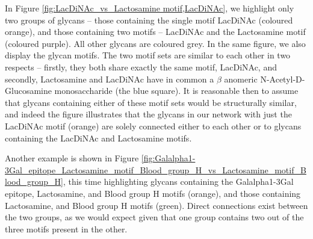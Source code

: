 \documentclass[12pt,a4paper]{article}
\begin{document}
In Figure \ref{fig:LacDiNAc_vs_Lactosamine motif,LacDiNAc}, we highlight only two groups of glycans -- those containing the single motif LacDiNAc (coloured orange), and those containing two motifs -- LacDiNAc and the Lactosamine motif (coloured purple). All other glycans are coloured grey. In the same figure, we also display the glycan motifs. The two motif sets are similar to each other in two respects -- firstly, they both share exactly the same motif, LacDiNAc, and secondly, Lactosamine and LacDiNAc have in common a $\beta$ anomeric N-Acetyl-D-Glucosamine monosaccharide (the blue square). It is reasonable then to assume that glycans containing either of these motif sets would be structurally similar, and indeed the figure illustrates that the glycans in our network with just the LacDiNAc motif  (orange) are solely connected either to each other or to glycans containing the LacDiNAc and Lactosamine motifs.

Another example is shown in Figure \ref{fig:Galalpha1-3Gal_epitope_Lactosamine_motif_Blood_group_H_vs_Lactosamine_motif_Blood_group_H}, this time highlighting glycans containing the Galalpha1-3Gal epitope, Lactosamine, and Blood group H motifs (orange), and those containing Lactosamine, and Blood group H motifs (green). Direct connections exist between the two groups, as we would expect given that one group contains two out of the three motifs present in the other.
\end{document}
